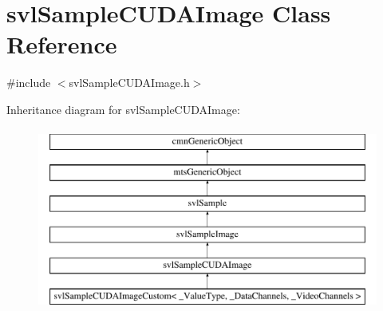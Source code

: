 \hypertarget{classsvl_sample_c_u_d_a_image}{}\section{svl\+Sample\+C\+U\+D\+A\+Image Class Reference}
\label{classsvl_sample_c_u_d_a_image}


{\ttfamily \#include $<$svl\+Sample\+C\+U\+D\+A\+Image.\+h$>$}

Inheritance diagram for svl\+Sample\+C\+U\+D\+A\+Image\+:\begin{figure}[H]
\begin{center}
\leavevmode
\includegraphics[height=6.000000cm]{d7/db6/classsvl_sample_c_u_d_a_image}
\end{center}
\end{figure}
